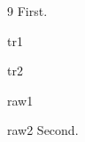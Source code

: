 \documentclass{article}
\begin{document}
\cite{a}
\begin{thebibliography}{9} First.
\begin{trivlist}\item tr1\item tr2\end{trivlist}
\makeatletter\begingroup\@trivlist\item raw1\item raw2\endtrivlist\endgroup\makeatother
{} Second.\end{thebibliography}
\end{document}
